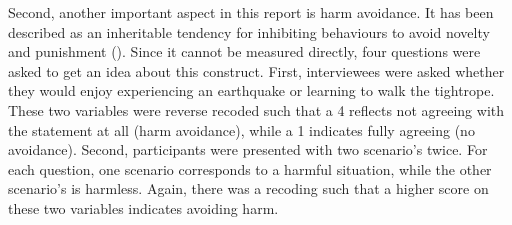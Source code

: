 \documentclass[11pt]{article}
\begin{document}
\begin{table}[h!]
\captionsetup{singlelinecheck=off}
\caption{Depression distribution}
\end{table}

\FloatBarrier

Second, another important aspect in this report is harm avoidance. It has been
described as an inheritable tendency for inhibiting behaviours to avoid novelty
and punishment (\cite{tse2011}). Since it cannot be measured directly, four
questions were asked to get an idea about this construct. First, interviewees
were asked whether they would enjoy experiencing an earthquake or learning to
walk the tightrope. These two variables were reverse recoded such that a 4
reflects not agreeing with the statement at all (harm avoidance), while a 1
indicates fully agreeing (no avoidance). Second, participants were presented
with two scenario's twice. For each question, one scenario corresponds to a
harmful situation, while the other scenario's is harmless. Again, there was a
recoding such that a higher score on these two variables indicates avoiding
harm.
\end{document}

